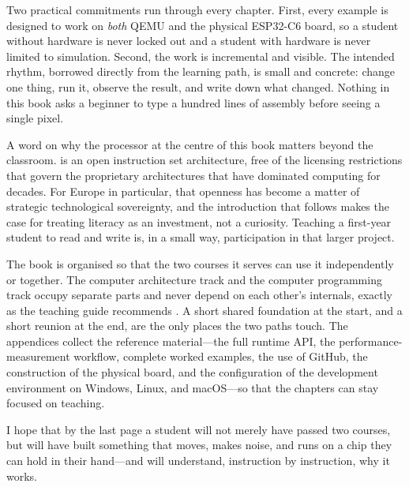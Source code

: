 Two practical commitments run through every chapter. First, every example is
designed to work on \emph{both} QEMU and the physical ESP32\nobreakdash-C6 board, so a
student without hardware is never locked out and a student with hardware is never
limited to simulation. Second, the work is incremental and visible. The intended
rhythm, borrowed directly from the \prg learning path, is small and concrete:
change one thing, run it, observe the result, and write down what changed.
Nothing in this book asks a beginner to type a hundred lines of assembly before
seeing a single pixel.

A word on why the processor at the centre of this book matters beyond the
classroom. \riscv is an open instruction set architecture, free of the licensing
restrictions that govern the proprietary architectures that have dominated
computing for decades. For Europe in particular, that openness has become a
matter of strategic technological sovereignty, and the introduction that follows
makes the case for treating \riscv literacy as an investment, not a curiosity.
Teaching a first-year student to read and write \riscv is, in a small way,
participation in that larger project.

The book is organised so that the two courses it serves can use it independently
or together. The computer architecture track and the computer programming track
occupy separate parts and never depend on each other's internals, exactly as the
\prg teaching guide recommends \citep{prg32teaching}. A short shared foundation at
the start, and a short reunion at the end, are the only places the two paths
touch. The appendices collect the reference material---the full runtime API, the
performance-measurement workflow, complete worked examples, the use of GitHub,
the construction of the physical board, and the configuration of the development
environment on Windows, Linux, and macOS---so that the chapters can stay focused
on teaching.

I hope that by the last page a student will not merely have passed two courses,
but will have built something that moves, makes noise, and runs on a chip they
can hold in their hand---and will understand, instruction by instruction, why it
works.
